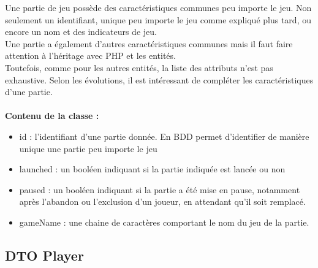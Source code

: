\documentclass{article}
\begin{document}
                Une partie de jeu possède des caractéristiques communes peu importe le jeu. Non seulement un identifiant, unique peu importe le jeu comme expliqué plus tard, ou encore un nom et des indicateurs de jeu.\\
                \indent Une partie a également d'autres caractéristiques communes mais il faut faire attention à l'héritage avec PHP et les entités.\\
                \indent Toutefois, comme pour les autres entités, la liste des attributs n'est pas exhaustive. Selon les évolutions, il est intéressant de compléter les caractéristiques d'une partie.\\
                \\
                \textbf{Contenu de la classe :}
                \begin{itemize}
                    \item id : l'identifiant d'une partie donnée. En BDD permet d'identifier de manière unique une partie peu importe le jeu
                    \item launched : un booléen indiquant si la partie indiquée est lancée ou non
                    \item paused : un booléen indiquant si la partie a été mise en pause, notamment après l'abandon ou l'exclusion d'un joueur, en attendant qu'il soit remplacé.
                    \item gameName : une chaine de caractères comportant le nom du jeu de la partie.
                \end{itemize}

            \subsection{DTO Player}
\end{document}
